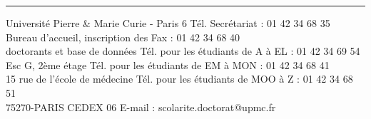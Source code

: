 \begin{titlepage}



\vfill \hspace{-1cm}
\begin{minipage}{\glarg}
{\rule{\glarg}{1pt}}
\begin{tiny}
  Université Pierre \& Marie Curie - Paris 6 \hfill Tél. Secrétariat : 01 42 34 68 35\\
  Bureau d’accueil, inscription des \hfill  Fax : 01 42 34 68 40\\
  doctorants et base de données \hfill Tél. pour les étudiants de A à EL : 01 42 34 69 54\\
  Esc G, 2ème étage \hfill Tél. pour les étudiants de EM à MON : 01 42 34 68 41\\
  15 rue de l’école de médecine \hfill  Tél. pour les étudiants de MOO à Z : 01 42 34 68 51\\
  75270-PARIS CEDEX 06 \hfill E-mail : scolarite.doctorat@upmc.fr
\end{tiny}
\end{minipage}



\end{titlepage}



